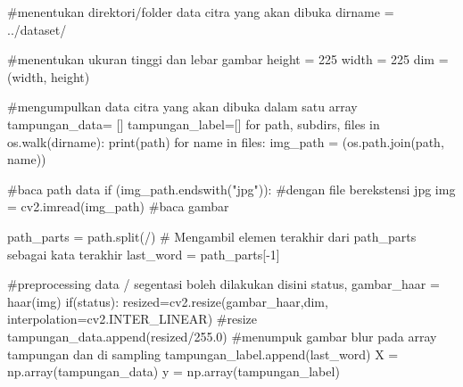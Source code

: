 \documentclass[
  letterpaper,
  DIV=11,
  numbers=noendperiod]{scrreprt}
\newenvironment{Shaded}{\begin{snugshade}}{\end{snugshade}}
\newcommand{\BuiltInTok}[1]{\textcolor[rgb]{0.00,0.23,0.31}{#1}}
\newcommand{\CommentTok}[1]{\textcolor[rgb]{0.37,0.37,0.37}{#1}}
\newcommand{\ControlFlowTok}[1]{\textcolor[rgb]{0.00,0.23,0.31}{#1}}
\newcommand{\DecValTok}[1]{\textcolor[rgb]{0.68,0.00,0.00}{#1}}
\newcommand{\FloatTok}[1]{\textcolor[rgb]{0.68,0.00,0.00}{#1}}
\newcommand{\KeywordTok}[1]{\textcolor[rgb]{0.00,0.23,0.31}{#1}}
\newcommand{\NormalTok}[1]{\textcolor[rgb]{0.00,0.23,0.31}{#1}}
\newcommand{\OperatorTok}[1]{\textcolor[rgb]{0.37,0.37,0.37}{#1}}
\newcommand{\StringTok}[1]{\textcolor[rgb]{0.13,0.47,0.30}{#1}}
\begin{document}
\begin{Shaded}
\begin{Highlighting}[]
\CommentTok{\#menentukan direktori/folder data citra yang akan dibuka}
\NormalTok{dirname }\OperatorTok{=} \StringTok{\textquotesingle{}../dataset/\textquotesingle{}}  

\CommentTok{\#menentukan ukuran tinggi dan lebar gambar}
\NormalTok{height }\OperatorTok{=} \DecValTok{225}
\NormalTok{width }\OperatorTok{=} \DecValTok{225}
\NormalTok{dim }\OperatorTok{=}\NormalTok{ (width, height)}

\CommentTok{\#mengumpulkan data citra yang akan dibuka dalam satu array}
\NormalTok{tampungan\_data}\OperatorTok{=}\NormalTok{ [] }
\NormalTok{tampungan\_label}\OperatorTok{=}\NormalTok{[]}
\ControlFlowTok{for}\NormalTok{ path, subdirs, files }\KeywordTok{in}\NormalTok{ os.walk(dirname):}
    \BuiltInTok{print}\NormalTok{(path)}
    \ControlFlowTok{for}\NormalTok{ name }\KeywordTok{in}\NormalTok{ files:}
\NormalTok{        img\_path }\OperatorTok{=}\NormalTok{ (os.path.join(path, name)) }

        \CommentTok{\#baca path data}
        \ControlFlowTok{if}\NormalTok{ (img\_path.endswith(}\StringTok{"jpg"}\NormalTok{)): }\CommentTok{\#dengan file berekstensi jpg}
\NormalTok{            img }\OperatorTok{=}\NormalTok{ cv2.imread(img\_path) }\CommentTok{\#baca gambar}
            
\NormalTok{            path\_parts }\OperatorTok{=}\NormalTok{ path.split(}\StringTok{\textquotesingle{}/\textquotesingle{}}\NormalTok{)}
            \CommentTok{\# Mengambil elemen terakhir dari path\_parts sebagai kata terakhir}
\NormalTok{            last\_word }\OperatorTok{=}\NormalTok{ path\_parts[}\OperatorTok{{-}}\DecValTok{1}\NormalTok{]}

            \CommentTok{\#preprocessing data / segentasi  boleh dilakukan disini}
\NormalTok{            status, gambar\_haar }\OperatorTok{=}\NormalTok{ haar(img)}
            \ControlFlowTok{if}\NormalTok{(status):}
\NormalTok{                resized}\OperatorTok{=}\NormalTok{cv2.resize(gambar\_haar,dim, interpolation}\OperatorTok{=}\NormalTok{cv2.INTER\_LINEAR) }\CommentTok{\#resize}
\NormalTok{                tampungan\_data.append(resized}\OperatorTok{/}\FloatTok{255.0}\NormalTok{) }\CommentTok{\#menumpuk gambar blur pada array tampungan dan di sampling}
\NormalTok{                tampungan\_label.append(last\_word)}
\NormalTok{    X }\OperatorTok{=}\NormalTok{ np.array(tampungan\_data) }
\NormalTok{    y }\OperatorTok{=}\NormalTok{ np.array(tampungan\_label)}
\end{Highlighting}
\end{Shaded}
\end{document}

